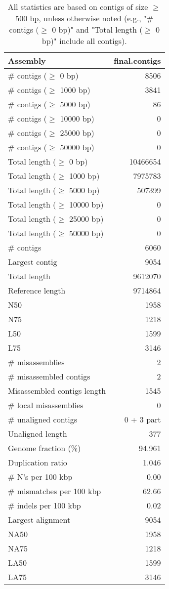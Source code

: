 \documentclass[12pt,a4paper]{article}
\begin{document}
\begin{table}[ht]
\begin{center}
\caption{All statistics are based on contigs of size $\geq$ 500 bp, unless otherwise noted (e.g., "\# contigs ($\geq$ 0 bp)" and "Total length ($\geq$ 0 bp)" include all contigs).}
\begin{tabular}{|l*{1}{|r}|}
\hline
Assembly & final.contigs \\ \hline
\# contigs ($\geq$ 0 bp) & 8506 \\ \hline
\# contigs ($\geq$ 1000 bp) & 3841 \\ \hline
\# contigs ($\geq$ 5000 bp) & 86 \\ \hline
\# contigs ($\geq$ 10000 bp) & 0 \\ \hline
\# contigs ($\geq$ 25000 bp) & 0 \\ \hline
\# contigs ($\geq$ 50000 bp) & 0 \\ \hline
Total length ($\geq$ 0 bp) & 10466654 \\ \hline
Total length ($\geq$ 1000 bp) & 7975783 \\ \hline
Total length ($\geq$ 5000 bp) & 507399 \\ \hline
Total length ($\geq$ 10000 bp) & 0 \\ \hline
Total length ($\geq$ 25000 bp) & 0 \\ \hline
Total length ($\geq$ 50000 bp) & 0 \\ \hline
\# contigs & 6060 \\ \hline
Largest contig & 9054 \\ \hline
Total length & 9612070 \\ \hline
Reference length & 9714864 \\ \hline
N50 & 1958 \\ \hline
N75 & 1218 \\ \hline
L50 & 1599 \\ \hline
L75 & 3146 \\ \hline
\# misassemblies & 2 \\ \hline
\# misassembled contigs & 2 \\ \hline
Misassembled contigs length & 1545 \\ \hline
\# local misassemblies & 0 \\ \hline
\# unaligned contigs & 0 + 3 part \\ \hline
Unaligned length & 377 \\ \hline
Genome fraction (\%) & 94.961 \\ \hline
Duplication ratio & 1.046 \\ \hline
\# N's per 100 kbp & 0.00 \\ \hline
\# mismatches per 100 kbp & 62.66 \\ \hline
\# indels per 100 kbp & 0.02 \\ \hline
Largest alignment & 9054 \\ \hline
NA50 & 1958 \\ \hline
NA75 & 1218 \\ \hline
LA50 & 1599 \\ \hline
LA75 & 3146 \\ \hline
\end{tabular}
\end{center}
\end{table}
\end{document}
